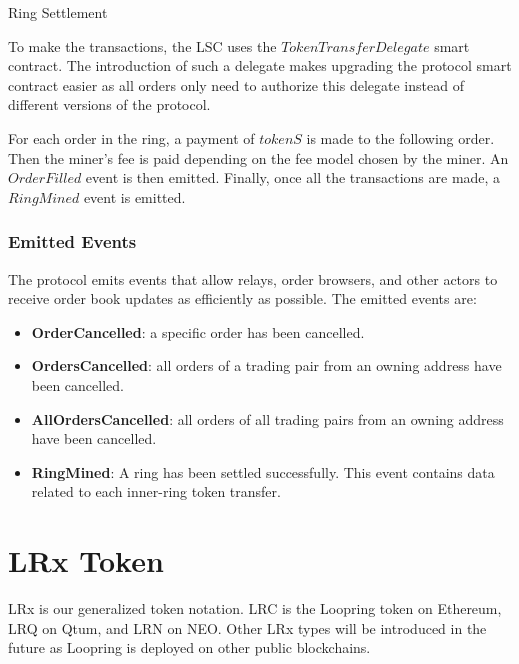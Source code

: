 \documentclass[UTF8,nofonts]{article}
\makeatletter
\newenvironment{figurehere}
 {\def\@captype{figure}}
 {}
\makeatother
\begin{document}
\begin{multicols}{2}
\begin{center}
\begin{figurehere}
\caption{Ring Settlement}
\label{fig:settlement}
\end{figurehere}
\end{center}

To make the transactions, the LSC uses the $TokenTransferDelegate$ smart contract. The introduction of such a delegate makes upgrading the protocol smart contract easier as all orders only need to authorize this delegate instead of different versions of the protocol.

For each order in the ring, a payment of $tokenS$ is made to the following order. Then the miner's fee is paid depending on the fee model chosen by the miner. An $OrderFilled$ event is then emitted. Finally, once all the transactions are made, a $RingMined$ event is emitted.

\subsubsection{Emitted Events\label{sec:events}}

The protocol emits events that allow relays, order browsers, and other actors to receive order book updates as efficiently as possible. The emitted events are:

\begin{itemize}
	\item \textbf{OrderCancelled}: a specific order has been cancelled.
	\item \textbf{OrdersCancelled}: all orders of a trading pair from an owning address have been cancelled.
	\item \textbf{AllOrdersCancelled}: all orders of all trading pairs from an owning address have been cancelled.
	\item \textbf{RingMined}: A ring has been settled successfully. This event contains data related to each inner-ring token transfer.
\end{itemize}


\section{LRx Token\label{sec:token}}
LRx is our generalized token notation. LRC is the Loopring token on Ethereum, LRQ on Qtum, and LRN on NEO. Other LRx types will be introduced in the future as Loopring is deployed on other public blockchains.


\end{multicols}
\end{document}
